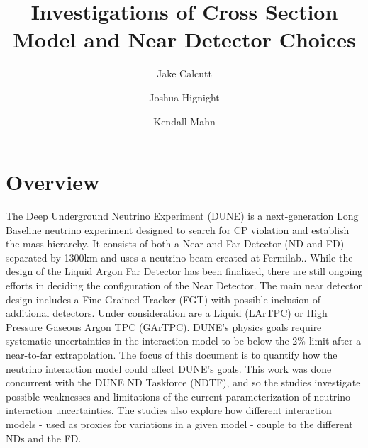 \documentclass[12pt]{article}
\title{Investigations of Cross Section Model and Near Detector Choices}
\date{}
\begin{document}
\author[1]{Jake Calcutt}
\author[1]{Joshua Hignight}
\author[1]{Kendall Mahn}


\maketitle
\thispagestyle{fancy}

\section{Overview}\label{sec:view}


The Deep Underground Neutrino Experiment (DUNE) is a next-generation Long Baseline neutrino experiment designed to search for CP violation and establish the mass hierarchy. It consists of both a Near and Far Detector (ND and FD) separated by 1300km and uses a neutrino beam created at Fermilab.\cite{DUNE_CDR1}. While the design of the Liquid Argon Far Detector has been finalized, there are still ongoing efforts in deciding the configuration of the Near Detector. The main near detector design includes a Fine-Grained Tracker (FGT) with possible inclusion of additional detectors. Under consideration are a Liquid (LArTPC) or High Pressure Gaseous Argon TPC (GArTPC). DUNE's physics goals require systematic uncertainties in the interaction model to be below the 2\% limit after a near-to-far extrapolation\cite{DUNE_review}. The focus of this document is to quantify how the neutrino interaction model could affect DUNE's goals. This work was done concurrent with the DUNE ND Taskforce (NDTF), and so the studies investigate possible weaknesses and limitations of the current parameterization of neutrino interaction uncertainties. The studies also explore how different interaction models - used as proxies for variations in a given model - couple to the different NDs and the FD.
\end{document}

